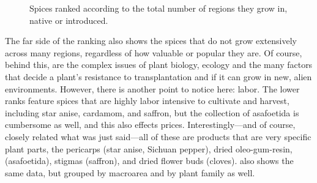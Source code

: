 \begin{figure}[!t]



	\caption{Spices ranked according to the total number of regions they grow in, native or introduced.}
	\label{fig:total_regions}
\end{figure}



The far side of the ranking also shows the spices that do not grow extensively across many regions, regardless of how valuable or popular they are. Of course, behind this, are the complex issues of plant biology, ecology and the many factors that decide a plant's resistance to transplantation and if it can grow in new, alien environments. However, there is another point to notice here: labor. The lower ranks feature spices that are highly labor intensive to cultivate and harvest, including star anise, cardamom, and saffron, but the collection of asafoetida is cumbersome as well, and this also effects prices. Interestingly---and of course, closely related what was just said---all of these are products that are very specific plant parts, the pericarps (star anise, Sichuan pepper), dried oleo-gum-resin, (asafoetida), stigmas (saffron), and dried flower buds (cloves).  also shows the same data, but grouped by macroarea and by plant family as well.


